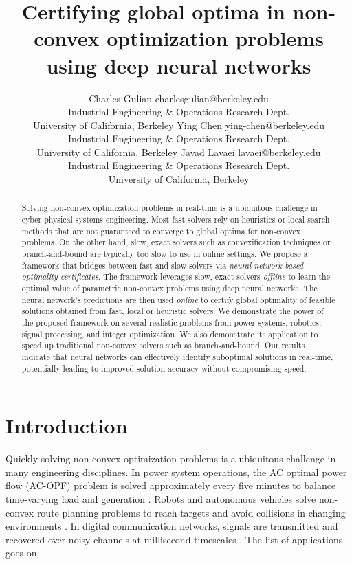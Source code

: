 \documentclass[10pt]{article} %
\title{Certifying global optima in non-convex optimization problems using deep neural networks}
\author{\name Charles Gulian \email charlesgulian@berkeley.edu \\
      \addr Industrial Engineering \& Operations Research Dept.\\
      University of California, Berkeley
      \AND
      \name Ying Chen \email ying-chen@berkeley.edu \\
      \addr Industrial Engineering \& Operations Research Dept.\\
      University of California, Berkeley
      \AND
      \name Javad Lavaei \email lavaei@berkeley.edu\\
      \addr Industrial Engineering \& Operations Research Dept.\\
      University of California, Berkeley}
\theoremstyle{plain}
\theoremstyle{definition}
\theoremstyle{remark}
\begin{document}
\maketitle

\begin{abstract}
Solving non-convex optimization problems in real-time is a ubiquitous challenge in cyber-physical systems engineering. 
Most fast solvers rely on heuristics or local search methods that are not guaranteed to converge to global optima for non-convex problems.
On the other hand, slow, exact solvers such as convexification techniques or branch-and-bound are typically too slow to use in online settings. 
We propose a framework that bridges between fast and slow solvers via \textit{neural network-based optimality certificates}. 
The framework leverages slow, exact solvers \textit{offline} to learn the optimal value of parametric non-convex problems using deep neural networks. 
The neural network's predictions are then used \textit{online} to certify global optimality of feasible solutions obtained from fast, local or heuristic solvers. 
We demonstrate the power of the proposed framework on several realistic problems from power systems, robotics, signal processing, and integer optimization. We also demonstrate its application to speed up traditional non-convex solvers such as branch-and-bound. Our results indicate that neural networks can effectively identify suboptimal solutions in real-time, potentially leading to improved solution accuracy without compromising speed.
\end{abstract}

\section{Introduction}

Quickly solving non-convex optimization problems is a ubiquitous challenge in many engineering disciplines. 
In power system operations, the AC optimal power flow (AC-OPF) problem is solved approximately every five minutes to balance time-varying load and generation \citep{van2021machine}.
Robots and autonomous vehicles solve non-convex route planning problems to reach targets and avoid collisions in changing environments \citep{ahmadi2016some}. 
In digital communication networks, signals are transmitted and recovered over noisy channels at millisecond timescales \citep{samuel2017deep}. 
The list of applications goes on.
\end{document}
